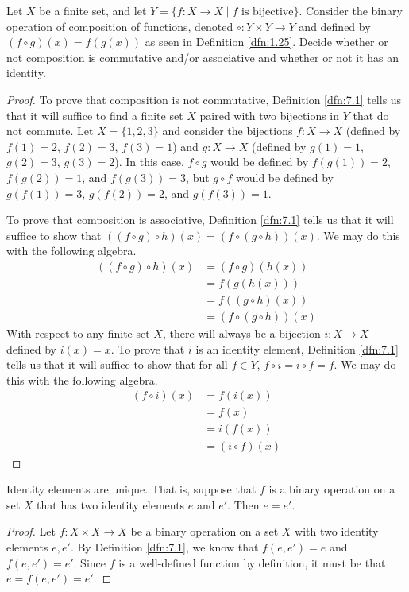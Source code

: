 \documentclass[../main.tex]{subfiles}
\begin{document}
\begin{exercise}\label{exr:7.6}
    Let $X$ be a finite set, and let $Y=\{f:X\to X\mid f\text{ is bijective}\}$. Consider the binary operation of composition of functions, denoted $\circ:Y\times Y\to Y$ and defined by $(f\circ g)(x)=f(g(x))$ as seen in Definition \ref{dfn:1.25}. Decide whether or not composition is commutative and/or associative and whether or not it has an identity.
    \begin{proof}
        To prove that composition is not commutative, Definition \ref{dfn:7.1} tells us that it will suffice to find a finite set $X$ paired with two bijections in $Y$ that do not commute. Let $X=\{1,2,3\}$ and consider the bijections $f:X\to X$ (defined by $f(1)=2$, $f(2)=3$, $f(3)=1$) and $g:X\to X$ (defined by $g(1)=1$, $g(2)=3$, $g(3)=2$). In this case, $f\circ g$ would be defined by $f(g(1))=2$, $f(g(2))=1$, and $f(g(3))=3$, but $g\circ f$ would be defined by $g(f(1))=3$, $g(f(2))=2$, and $g(f(3))=1$.\par
        To prove that composition is associative, Definition \ref{dfn:7.1} tells us that it will suffice to show that $((f\circ g)\circ h)(x)=(f\circ(g\circ h))(x)$. We may do this with the following algebra.
        \begin{align*}
            ((f\circ g)\circ h)(x) &= (f\circ g)(h(x))\\
            &= f(g(h(x)))\\
            &= f((g\circ h)(x))\\
            &= (f\circ(g\circ h))(x)
        \end{align*}
        With respect to any finite set $X$, there will always be a bijection $i:X\to X$ defined by $i(x)=x$. To prove that $i$ is an identity element, Definition \ref{dfn:7.1} tells us that it will suffice to show that for all $f\in Y$, $f\circ i=i\circ f=f$. We may do this with the following algebra.
        \begin{align*}
            (f\circ i)(x) &= f(i(x))\\
            &= f(x)\\
            &= i(f(x))\\
            &= (i\circ f)(x)
        \end{align*}
    \end{proof}
\end{exercise}

\begin{theorem}\label{trm:7.7}
    Identity elements are unique. That is, suppose that $f$ is a binary operation on a set $X$ that has two identity elements $e$ and $e'$. Then $e=e'$.
    \begin{proof}
        Let $f:X\times X\to X$ be a binary operation on a set $X$ with two identity elements $e,e'$. By Definition \ref{dfn:7.1}, we know that $f(e,e')=e$ and $f(e,e')=e'$. Since $f$ is a well-defined function by definition, it must be that $e=f(e,e')=e'$.
    \end{proof}
\end{theorem}
\end{document}
